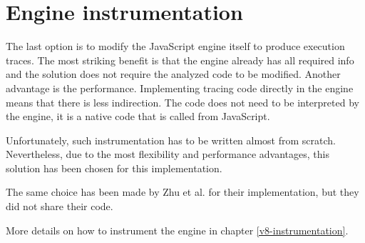 \section{Engine instrumentation}
The last option is to modify the JavaScript engine itself to produce execution traces.
The most striking benefit is that the engine already has all required info and the solution 
does not require the analyzed code to be modified.
Another advantage is the performance. Implementing tracing code directly in the engine means 
that there is less indirection. The code does not need to be interpreted by the engine, it is a native code
that is called from JavaScript.

Unfortunately, such instrumentation has to be written almost from scratch. 
Nevertheless, due to the most flexibility and performance advantages, this solution has been chosen 
for this implementation.

The same choice has been made by Zhu et al. \cite{DBLP:conf/ndss/ZhuHQSY18} for their implementation, 
but they did not share their code.

More details on how to instrument the engine in chapter \ref{v8-instrumentation}.
